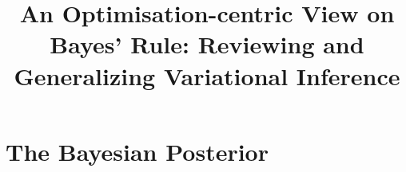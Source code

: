 \documentclass[twoside,11pt]{article}
\begin{document}
\title{An Optimisation-centric View on Bayes' Rule: Reviewing and Generalizing Variational Inference}



\maketitle


\section{The Bayesian Posterior}\label{sec:bayesian-posterior}
\end{document}
